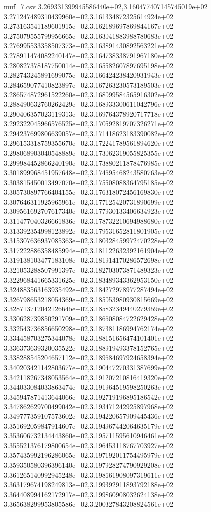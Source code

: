 \begin{filecontents*}{muf_7.csv}
3.269331399945586440e+02,3.160477407145745019e+02
3.271247489310439960e+02,3.161334872325614924e+02
3.273163541189601915e+02,3.162189697869844167e+02
3.275079555799956665e+02,3.163041883988780683e+02
3.276995533358507373e+02,3.163891430892563221e+02
3.278911474082240147e+02,3.164738338791967180e+02
3.280827378187750014e+02,3.165582607897695198e+02
3.282743245891699075e+02,3.166424238420931943e+02
3.284659077410823897e+02,3.167263230573189503e+02
3.286574872961522260e+02,3.168099584565916302e+02
3.288490632760262429e+02,3.168933300611042796e+02
3.290406357023119313e+02,3.169764378920717718e+02
3.292322045966576525e+02,3.170592819707326271e+02
3.294237699806639057e+02,3.171418623183390082e+02
3.296153318759355670e+02,3.172241789561894620e+02
3.298068903040548889e+02,3.173062319055825355e+02
3.299984452866240190e+02,3.173880211878476985e+02
3.301899968451957648e+02,3.174695468243580763e+02
3.303815450013497070e+02,3.175508088364795185e+02
3.305730897766404155e+02,3.176318072456169830e+02
3.307646311925965961e+02,3.177125420731890699e+02
3.309561692707617340e+02,3.177930133406634923e+02
3.311477040326661836e+02,3.178732210694988680e+02
3.313392354998123892e+02,3.179531652811801905e+02
3.315307636937085363e+02,3.180328459972470228e+02
3.317222886358485994e+02,3.181122632392161904e+02
3.319138103477183108e+02,3.181914170286572698e+02
3.321053288507991397e+02,3.182703073871489323e+02
3.322968441665331625e+02,3.183489343362953150e+02
3.324883563163935492e+02,3.184272978977287494e+02
3.326798653218054369e+02,3.185053980930815669e+02
3.328713712042126645e+02,3.185832349440279359e+02
3.330628739850291709e+02,3.186608084722629428e+02
3.332543736856650298e+02,3.187381186994762174e+02
3.334458703275344078e+02,3.188151656474101401e+02
3.336373639320035522e+02,3.188919493378152765e+02
3.338288545204657112e+02,3.189684697924658394e+02
3.340203421142803677e+02,3.190447270331387699e+02
3.342118267348053564e+02,3.191207210816419320e+02
3.344033084033863474e+02,3.191964519598250263e+02
3.345947871413644066e+02,3.192719196895186542e+02
3.347862629700499042e+02,3.193471242925897968e+02
3.349777359107573602e+02,3.194220657909445436e+02
3.351692059847914607e+02,3.194967442064635179e+02
3.353606732134443860e+02,3.195711595610946461e+02
3.355521376179800654e+02,3.196453118767703927e+02
3.357435992196286065e+02,3.197192011754495979e+02
3.359350580396396140e+02,3.197928274790929208e+02
3.361265140992945248e+02,3.198661908097319611e+02
3.363179674198249813e+02,3.199392911893792188e+02
3.364408994162172917e+02,3.199860908032624138e+02
3.365638299953805586e+02,3.200327843208824561e+02

\end{filecontents*}
